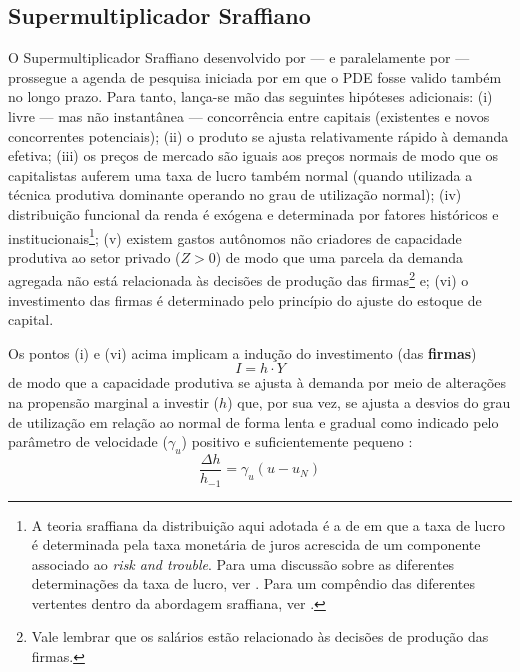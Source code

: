 \subsection{Supermultiplicador Sraffiano}\label{SecSuper}

O Supermultiplicador Sraffiano desenvolvido por \textcite{serrano_sraffian_1995} --- e paralelamente por \textcite{bortis_institutions_1996} --- prossegue a agenda de pesquisa iniciada por \textcite{garegnani_problem_2015} em que o PDE fosse valido também no longo prazo. 
Para tanto, lança-se mão das seguintes hipóteses adicionais: 
	(i) livre --- mas não instantânea --- concorrência entre capitais (existentes e novos concorrentes potenciais);
	(ii) o produto se ajusta relativamente rápido à demanda efetiva;
	(iii) os preços de mercado são iguais aos preços normais de modo que os capitalistas auferem uma taxa de lucro também normal (quando utilizada a técnica produtiva dominante operando no grau de utilização normal);
	(iv) distribuição funcional da renda é exógena e determinada por fatores históricos e institucionais\footnote{
		A teoria sraffiana da distribuição aqui adotada é a de \textcite{pivetti_essay_1992} em que a taxa de lucro é determinada pela taxa monetária de juros acrescida de um componente associado ao \textit{risk and trouble}.
		Para uma discussão sobre as diferentes determinações da taxa de lucro, ver \textcite{serrano_teoria_1988}.
		Para um compêndio das diferentes vertentes dentro da abordagem sraffiana, ver \textcite{aspromourgos_sraffian_2004}.
	};
	(v) existem gastos autônomos não criadores de capacidade produtiva ao setor privado ($Z>0$) de modo que uma parcela da demanda agregada não está relacionada às decisões de produção das firmas\footnote{
		Vale lembrar que os salários estão relacionado às decisões de produção das firmas.
	} e;
	(vi) o investimento das firmas é determinado pelo princípio do ajuste do estoque de capital.

Os pontos (i) e (vi) acima implicam a indução do investimento (das \textbf{firmas}) 
$$
I = h\cdot Y
$$
de modo que a capacidade produtiva se ajusta à demanda por meio de alterações na propensão marginal a investir ($h$) que, por sua vez, se ajusta a desvios do grau de utilização em relação ao normal de forma lenta e gradual como indicado pelo parâmetro de velocidade ($\gamma_u$) positivo e suficientemente pequeno \cite[p.~271]{freitas_growth_2015}:
$$
\frac{\Delta h}{h_{-1}} = \gamma_u (u - u_N)
$$

